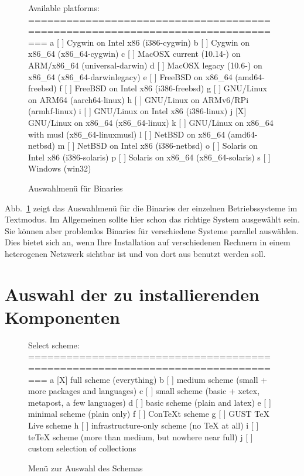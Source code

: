 \documentclass[12pt,ngerman,a4paper,fullparskip]{report}
\begin{document}
\begin{figure}[tb]
\begin{boxedverbatim}
Available platforms:
===============================================================================
   a [ ] Cygwin on Intel x86 (i386-cygwin)
   b [ ] Cygwin on x86_64 (x86_64-cygwin)
   c [ ] MacOSX current (10.14-) on ARM/x86_64 (universal-darwin)
   d [ ] MacOSX legacy (10.6-) on x86_64 (x86_64-darwinlegacy)
   e [ ] FreeBSD on x86_64 (amd64-freebsd)
   f [ ] FreeBSD on Intel x86 (i386-freebsd)
   g [ ] GNU/Linux on ARM64 (aarch64-linux)
   h [ ] GNU/Linux on ARMv6/RPi (armhf-linux)
   i [ ] GNU/Linux on Intel x86 (i386-linux)
   j [X] GNU/Linux on x86_64 (x86_64-linux)
   k [ ] GNU/Linux on x86_64 with musl (x86_64-linuxmusl)
   l [ ] NetBSD on x86_64 (amd64-netbsd)
   m [ ] NetBSD on Intel x86 (i386-netbsd)
   o [ ] Solaris on Intel x86 (i386-solaris)
   p [ ] Solaris on x86_64 (x86_64-solaris)
   s [ ] Windows (win32)
\end{boxedverbatim}
\caption{Auswahlmenü für Binaries}\label{fig:bin-text}
\end{figure}

\noindent Abb.~\ref{fig:bin-text} zeigt das Auswahlmenü für die Binaries der einzelnen Betriebssysteme im Textmodus. Im Allgemeinen sollte hier schon das richtige System ausgewählt sein. Sie können aber problemlos Binaries
für verschiedene Systeme parallel auswählen. Dies bietet sich an, wenn Ihre Installation auf verschiedenen Rechnern in einem heterogenen Netzwerk sichtbar ist und von dort aus benutzt werden soll.

\section{Auswahl der zu installierenden Komponenten}\label{sec:components}

\begin{figure}[tbh]
\begin{boxedverbatim}
Select scheme:
===============================================================================
 a [X] full scheme (everything)
 b [ ] medium scheme (small + more packages and languages)
 c [ ] small scheme (basic + xetex, metapost, a few languages)
 d [ ] basic scheme (plain and latex)
 e [ ] minimal scheme (plain only)
 f [ ] ConTeXt scheme
 g [ ] GUST TeX Live scheme
 h [ ] infrastructure-only scheme (no TeX at all)
 i [ ] teTeX scheme (more than medium, but nowhere near full)
 j [ ] custom selection of collections
\end{boxedverbatim}
\caption{Menü zur Auswahl des Schemas}\label{fig:scheme-text}
\end{figure}
\end{document}
